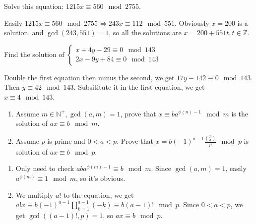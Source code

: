 \documentclass{ctexart}
\newif\ifpreface
\begin{document}
\large
\iffalse
  \setlength{\baselineskip}{1.2em}
  \ifpreface
    
  \else
    \maketitle
  \fi
\fi
{}
\begin{problem}\label{pro:p53.1ii}
  Solve this equation: \(1215x \equiv 560 \mod 2755\).
\end{problem}
\begin{solution}
  Easily \(1215x \equiv 560 \mod 2755 \iff 243 x \equiv 112 \mod 551 \).
  Obviously \(x=200\) is a solution, and \(\gcd(243,551)=1\), so all the solutions are
  \(x=200+551t,t \in \mathbb{Z}\).
\end{solution}
\begin{problem}\label{pro:p53.2}
  Find the solution of \(\begin{cases}
    x+4y-29\equiv 0 \mod 143 \\
    2x-9y+84 \equiv 0 \mod 143
  \end{cases}\)
\end{problem}
\begin{solution}
  Double the first equation then minus the second, we get \(17 y -142 \equiv 0 \mod 143\).
  Then \(y \equiv 42 \mod 143\).
  Subsititute it in the first equation, we get \(x \equiv 4 \mod 143\).
\end{solution}
\begin{problem}\label{pro:p53.3}
  \begin{enumerate}
    \item Assume \(m \in \mathbb{N}^+,\gcd(a,m)=1\), prove that
      \(x \equiv b a^{\phi(n)-1} \mod m\) is the solution of \(ax \equiv b \mod m\).
    \item Assume \(p\) is prime and \(0<a<p\). Prove that \(x=b(-1)^{a-1} \frac{\binom{p}{a}}{p} \mod p\) is solution of \(ax \equiv b \mod p\).
  \end{enumerate}
\end{problem}
\begin{solution}
  \begin{enumerate}
    \item Only need to check \(aba^{\phi(m)-1}\equiv b \mod m\).
      Since \(\gcd(a,m)=1\), easily \(a^{\phi(m)} \equiv 1 \mod m\), so it's obvious.
    \item
      We multiply \(a!\) to the equation, we get \(a! x \equiv b(-1)^{a-1} \prod_{k=1}^{a-1} (-k) \equiv b (a-1)! \mod p\).
      Since \(0<a<p\), we get \(\gcd((a-1)!,p)=1\), so \(a x \equiv b \mod p\).
  \end{enumerate}
\end{solution}
\end{document}
